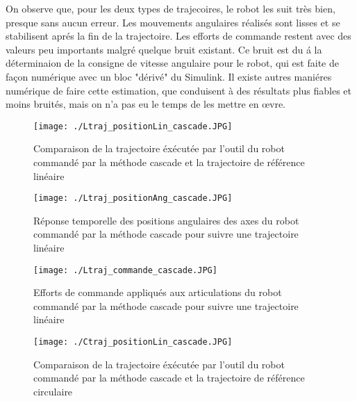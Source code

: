 On observe que, pour les deux types de trajecoires, le robot les suit très bien, presque sans aucun erreur. Les mouvements angulaires réalisés sont lisses et se stabilisent aprés la fin de la trajectoire. Les efforts de commande restent avec des valeurs peu importants malgré quelque bruit existant. Ce bruit est du á la déterminaion de la consigne de vitesse angulaire pour le robot, qui est faite de façon numérique avec un bloc "dérivé" du Simulink. Il existe autres maniéres numérique de faire cette estimation, que conduisent à des résultats plus fiables et moins bruités, mais on n'a pas eu le temps de les mettre en \oe{}vre.

\begin{figure}[H]
	\begin{center}	
		\captionsetup{justification=centering,margin=1cm}
		\texttt{[image: ./Ltraj\_positionLin\_cascade.JPG]}
		\caption{Comparaison de la trajectoire éxécutée par l'outil du robot commandé par la méthode cascade et la trajectoire de référence linéaire}
		\label{fig:Ltraj_positionLin_cascade}
	\end{center}
\end{figure}

\begin{figure}[H]
	\begin{center}
		\captionsetup{justification=centering,margin=1cm}	
		\texttt{[image: ./Ltraj\_positionAng\_cascade.JPG]}
		\caption{Réponse temporelle des positions angulaires des axes du robot commandé par la méthode cascade pour suivre une trajectoire linéaire}
		\label{fig:Ltraj_positionAng_cascade}
	\end{center}
\end{figure}

\begin{figure}[H]
	\begin{center}
		\captionsetup{justification=centering,margin=1cm}	
		\texttt{[image: ./Ltraj\_commande\_cascade.JPG]}
		\caption{Efforts de commande appliqués aux articulations du robot commandé par la méthode cascade pour suivre une trajectoire linéaire}
		\label{fig:Ltraj_commande_cascade}
	\end{center}
\end{figure}
\newpage
\begin{figure}[H]
	\begin{center}	
		\captionsetup{justification=centering,margin=1cm}
		\texttt{[image: ./Ctraj\_positionLin\_cascade.JPG]}
		\caption{Comparaison de la trajectoire éxécutée par l'outil du robot commandé par la méthode cascade et la trajectoire de référence circulaire}
		\label{fig:Ctraj_positionLin_cascade}
	\end{center}
\end{figure}


